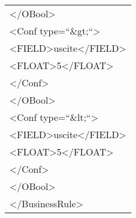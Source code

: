 \begin{center}
\begin{tabular}{|p{11cm}|}
\textless /OBool\textgreater \\
\textless Conf type=``\&gt;``\textgreater \\
\textless FIELD\textgreater uscite\textless /FIELD\textgreater\\
 \textless FLOAT\textgreater 5\textless /FLOAT\textgreater\\
 \textless /Conf\textgreater\\
\textless /OBool\textgreater \\
\textless Conf type=``\&lt;``\textgreater \\
\textless FIELD\textgreater uscite\textless /FIELD\textgreater\\
 \textless FLOAT\textgreater 5\textless /FLOAT\textgreater\\
 \textless /Conf\textgreater\\
\textless /OBool\textgreater \\
\textless /BusinessRule\textgreater \\
 \hline
\end{tabular} \\
\end{center}


